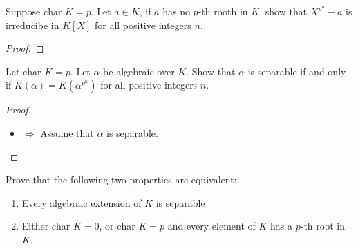 \begin{exercise}
    Suppose $\text{char } K = p$. Let $a\in K$, if $a$ has no $p$-th rooth in $K$, show that $X^{p^n} - a$ is irreducibe in $K[X]$ for all positive integers $n$.
    \begin{proof}

    \end{proof}
\end{exercise}
\begin{exercise}
    Let $\text{char }K = p$. Let $\alpha$ be algebraic over $K$. Show that $\alpha$ is separable if and only if $K(\alpha) = K(\alpha^{p^n})$ for all positive integers $n$.
    \begin{proof}
        \begin{itemize}
            \item $\Rightarrow$ Assume that $\alpha$ is separable. 
        \end{itemize}
    \end{proof}
\end{exercise}
\begin{exercise}
    Prove that the following two properties are equivalent:\begin{enumerate}[label = (\alph*)]
        \item Every algebraic extension of $K$ is separable
        \item Either $\text{char }K = 0$, or $\text{char }K=p$ and every element of $K$ has a $p$-th root in $K$.
    \end{enumerate}
\end{exercise}

